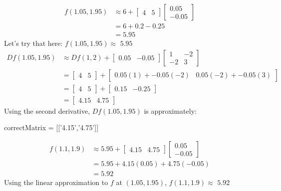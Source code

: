 \documentclass{article}
\newcommand{\verticalvector}[1]{\begin{bmatrix}#1\end{bmatrix}}
\newcommand{\answer}[1]{#1}
\newenvironment{question}{}{}
\newenvironment{matrix-answer}{}{}
\newenvironment{hint}{}{}
\newenvironment{solution}{}{}
\begin{document}
\begin{question}
  \begin{solution}
    \begin{hint}
      \begin{align*}
        f(1.05,1.95) &\approx 6+\begin{bmatrix} 4 & 5 \end{bmatrix} \verticalvector{0.05\\-0.05}\\
        &=6+0.2-0.25\\
        &=5.95
      \end{align*}
    \end{hint}
    Let's try that here:  $f(1.05,1.95) \approx$ \answer{$5.95$}
  \end{solution}
  \begin{solution}
    \begin{hint}
      \begin{align*}
        Df(1.05,1.95) &\approx Df(1,2)+\begin{bmatrix} 0.05 & -0.05\end{bmatrix}\begin{bmatrix} 1 & -2 \\ -2 & 3\end{bmatrix}\\
        &= \begin{bmatrix} 4 & 5 \end{bmatrix} + \begin{bmatrix} 0.05(1)+-0.05(-2) & 0.05(-2)+-0.05(3)\end{bmatrix}\\
        &=\begin{bmatrix} 4 & 5 \end{bmatrix} + \begin{bmatrix} 0.15 & -0.25\end{bmatrix}\\
        &=\begin{bmatrix} 4.15 & 4.75\end{bmatrix}
      \end{align*}
    \end{hint}
    Using the second derivative, $Df(1.05,1.95) $ is approximately:
    \begin{matrix-answer}
      correctMatrix = [['4.15','4.75']]
    \end{matrix-answer}
  \end{solution}
  \begin{solution}
    \begin{hint}
      \begin{align*}
        f(1.1,1.9) &\approx 5.95+\begin{bmatrix} 4.15 & 4.75 \end{bmatrix} \verticalvector{0.05\\-0.05}\\
        &=5.95+4.15(0.05)+4.75(-0.05)\\
        &=5.92
      \end{align*}
    \end{hint}
    Using the linear approximation to $f$ at $(1.05,1.95)$, $f(1.1,1.9) \approx$ \answer{$5.92$ }
  \end{solution}
  

\end{question}
\end{document}
